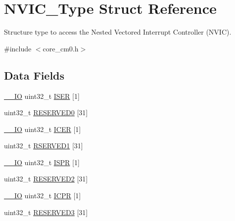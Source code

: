 \hypertarget{struct_n_v_i_c___type}{}\section{N\+V\+I\+C\+\_\+\+Type Struct Reference}
\label{struct_n_v_i_c___type}


Structure type to access the Nested Vectored Interrupt Controller (N\+V\+IC).  




{\ttfamily \#include $<$core\+\_\+cm0.\+h$>$}

\subsection*{Data Fields}
\begin{DoxyCompactItemize}
\item 
\mbox{\hyperlink{core__sc300_8h_aec43007d9998a0a0e01faede4133d6be}{\+\_\+\+\_\+\+IO}} uint32\+\_\+t \mbox{\hyperlink{struct_n_v_i_c___type_a95686b1da7037feece357d91ba5f5325}{I\+S\+ER}} \mbox{[}1\mbox{]}
\item 
uint32\+\_\+t \mbox{\hyperlink{struct_n_v_i_c___type_a148e6e212dc15628998e8f4239290665}{R\+E\+S\+E\+R\+V\+E\+D0}} \mbox{[}31\mbox{]}
\item 
\mbox{\hyperlink{core__sc300_8h_aec43007d9998a0a0e01faede4133d6be}{\+\_\+\+\_\+\+IO}} uint32\+\_\+t \mbox{\hyperlink{struct_n_v_i_c___type_a5524644c804c18c22addd691d4da53e4}{I\+C\+ER}} \mbox{[}1\mbox{]}
\item 
uint32\+\_\+t \mbox{\hyperlink{struct_n_v_i_c___type_a62ae13b33cd85ec43b6f84d85b7ea9c6}{R\+S\+E\+R\+V\+E\+D1}} \mbox{[}31\mbox{]}
\item 
\mbox{\hyperlink{core__sc300_8h_aec43007d9998a0a0e01faede4133d6be}{\+\_\+\+\_\+\+IO}} uint32\+\_\+t \mbox{\hyperlink{struct_n_v_i_c___type_ae3434eff1b1db4ce857c73a4ef1af273}{I\+S\+PR}} \mbox{[}1\mbox{]}
\item 
uint32\+\_\+t \mbox{\hyperlink{struct_n_v_i_c___type_a6e578ce633e8b80c70bc612a1bf8a965}{R\+E\+S\+E\+R\+V\+E\+D2}} \mbox{[}31\mbox{]}
\item 
\mbox{\hyperlink{core__sc300_8h_aec43007d9998a0a0e01faede4133d6be}{\+\_\+\+\_\+\+IO}} uint32\+\_\+t \mbox{\hyperlink{struct_n_v_i_c___type_a281c819da5f0f4265f5b88d269544bc9}{I\+C\+PR}} \mbox{[}1\mbox{]}
\item 
uint32\+\_\+t \mbox{\hyperlink{struct_n_v_i_c___type_afbefcd166e59396eadde34d46bfc4539}{R\+E\+S\+E\+R\+V\+E\+D3}} \mbox{[}31\mbox{]}
\item 

\end{DoxyCompactItemize}
